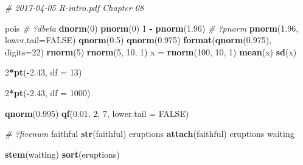 \documentclass[10pt,]{krantz}
\makeatletter
\newenvironment{Shaded}{\begin{snugshade}}{\end{snugshade}}
\newcommand{\KeywordTok}[1]{\textcolor[rgb]{0.13,0.29,0.53}{\textbf{#1}}}
\newcommand{\DataTypeTok}[1]{\textcolor[rgb]{0.13,0.29,0.53}{#1}}
\newcommand{\DecValTok}[1]{\textcolor[rgb]{0.00,0.00,0.81}{#1}}
\newcommand{\FloatTok}[1]{\textcolor[rgb]{0.00,0.00,0.81}{#1}}
\newcommand{\StringTok}[1]{\textcolor[rgb]{0.31,0.60,0.02}{#1}}
\newcommand{\CommentTok}[1]{\textcolor[rgb]{0.56,0.35,0.01}{\textit{#1}}}
\newcommand{\OtherTok}[1]{\textcolor[rgb]{0.56,0.35,0.01}{#1}}
\newcommand{\OperatorTok}[1]{\textcolor[rgb]{0.81,0.36,0.00}{\textbf{#1}}}
\newcommand{\NormalTok}[1]{#1}
\newenvironment{kframe}{%
\medskip{}
\setlength{\fboxsep}{.8em}
 \def\at@end@of@kframe{}%
 \ifinner\ifhmode%
  \def\at@end@of@kframe{\end{minipage}}%
  \begin{minipage}{\columnwidth}%
 \fi\fi%
 \def\FrameCommand##1{\hskip\@totalleftmargin \hskip-\fboxsep
 \colorbox{shadecolor}{##1}\hskip-\fboxsep
     \hskip-\linewidth \hskip-\@totalleftmargin \hskip\columnwidth}%
 \MakeFramed {\advance\hsize-\width
   \@totalleftmargin\z@ \linewidth\hsize
   \@setminipage}}%
 {\par\unskip\endMakeFramed%
 \at@end@of@kframe}
\renewenvironment{Shaded}{\begin{kframe}}{\end{kframe}}
\makeatother
\begin{document}
\begin{Shaded}
\begin{Highlighting}[]
\CommentTok{# 2017-04-05 R-intro.pdf Chapter 08}

\NormalTok{pois}
\CommentTok{# ?dbeta}
\KeywordTok{dnorm}\NormalTok{(}\DecValTok{0}\NormalTok{)}
\KeywordTok{pnorm}\NormalTok{(}\DecValTok{0}\NormalTok{)}
\DecValTok{1} \OperatorTok{-}\StringTok{ }\KeywordTok{pnorm}\NormalTok{(}\FloatTok{1.96}\NormalTok{)}
\CommentTok{# ?pnorm}
\KeywordTok{pnorm}\NormalTok{(}\FloatTok{1.96}\NormalTok{, }\DataTypeTok{lower.tail=}\OtherTok{FALSE}\NormalTok{)}
\KeywordTok{qnorm}\NormalTok{(}\FloatTok{0.5}\NormalTok{)}
\KeywordTok{qnorm}\NormalTok{(}\FloatTok{0.975}\NormalTok{)}
\KeywordTok{format}\NormalTok{(}\KeywordTok{qnorm}\NormalTok{(}\FloatTok{0.975}\NormalTok{), }\DataTypeTok{digits=}\DecValTok{22}\NormalTok{)}
\KeywordTok{rnorm}\NormalTok{(}\DecValTok{5}\NormalTok{)}
\KeywordTok{rnorm}\NormalTok{(}\DecValTok{5}\NormalTok{, }\DecValTok{10}\NormalTok{, }\DecValTok{1}\NormalTok{)}
\NormalTok{x =}\StringTok{ }\KeywordTok{rnorm}\NormalTok{(}\DecValTok{100}\NormalTok{, }\DecValTok{10}\NormalTok{, }\DecValTok{1}\NormalTok{)}
\KeywordTok{mean}\NormalTok{(x)}
\KeywordTok{sd}\NormalTok{(x)}

\DecValTok{2}\OperatorTok{*}\KeywordTok{pt}\NormalTok{(}\OperatorTok{-}\FloatTok{2.43}\NormalTok{, }\DataTypeTok{df =} \DecValTok{13}\NormalTok{)}

\DecValTok{2}\OperatorTok{*}\KeywordTok{pt}\NormalTok{(}\OperatorTok{-}\FloatTok{2.43}\NormalTok{, }\DataTypeTok{df =} \DecValTok{1000}\NormalTok{)}

\KeywordTok{qnorm}\NormalTok{(}\FloatTok{0.995}\NormalTok{)}
\KeywordTok{qf}\NormalTok{(}\FloatTok{0.01}\NormalTok{, }\DecValTok{2}\NormalTok{, }\DecValTok{7}\NormalTok{, }\DataTypeTok{lower.tail =} \OtherTok{FALSE}\NormalTok{)}

\CommentTok{# ?fivenum}
\NormalTok{faithful}
\KeywordTok{str}\NormalTok{(faithful)}
\NormalTok{eruptions}
\KeywordTok{attach}\NormalTok{(faithful)}
\NormalTok{eruptions}
\NormalTok{waiting}

\KeywordTok{stem}\NormalTok{(waiting)}
\KeywordTok{sort}\NormalTok{(eruptions)}


\end{Highlighting}
\end{Shaded}
\end{document}
